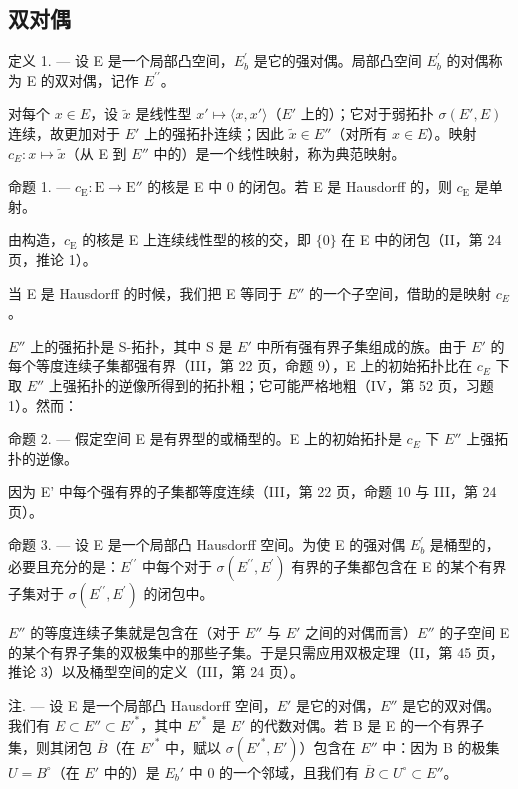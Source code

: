 \subsection{双对偶}

定义 1. --- 设 E 是一个局部凸空间，\(E_{b}^{\prime}\) 是它的强对偶。局部凸空间 \(E_{b}^{\prime}\) 的对偶称为 E 的双对偶，记作 \(E^{\prime\prime}\)。

对每个 \(x \in E\)，设 \(\tilde{x}\) 是线性型 \(x' \mapsto \langle x, x' \rangle\)（\(E'\) 上的）；它对于弱拓扑 \(\sigma(E', E)\) 连续，故更加对于 \(E'\) 上的强拓扑连续；因此 \(\tilde{x} \in E''\)（对所有 \(x \in E\)）。映射 \(c_{E}: x \mapsto \tilde{x}\)（从 E 到 \(E''\) 中的）是一个线性映射，称为典范映射。

命题 1. --- \(c_{\mathrm{E}}: \mathrm{E} \to \mathrm{E}''\) 的核是 E 中 0 的闭包。若 E 是 Hausdorff 的，则 \(c_{\mathrm{E}}\) 是单射。

由构造，\(c_{\mathrm{E}}\) 的核是 E 上连续线性型的核的交，即 \(\{0\}\) 在 E 中的闭包（II，第 24 页，推论 1）。

当 E 是 Hausdorff 的时候，我们把 E 等同于 \(E''\) 的一个子空间，借助的是映射 \(c_{E}\)。

\(E''\) 上的强拓扑是 S-拓扑，其中 S 是 \(E'\) 中所有强有界子集组成的族。由于 \(E'\) 的每个等度连续子集都强有界（III，第 22 页，命题 9），E 上的初始拓扑比在 \(c_{E}\) 下取 \(E''\) 上强拓扑的逆像所得到的拓扑粗；它可能严格地粗（IV，第 52 页，习题 1）。然而：

命题 2. --- 假定空间 E 是有界型的或桶型的。E 上的初始拓扑是 \(c_{E}\) 下 \(E''\) 上强拓扑的逆像。

因为 E' 中每个强有界的子集都等度连续（III，第 22 页，命题 10 与 III，第 24 页）。

命题 3. --- 设 E 是一个局部凸 Hausdorff 空间。为使 E 的强对偶 \(E_{b}^{\prime}\) 是桶型的，必要且充分的是：\(E^{\prime\prime}\) 中每个对于 \(\sigma(E^{\prime\prime}, E^{\prime})\) 有界的子集都包含在 E 的某个有界子集对于 \(\sigma(E^{\prime\prime}, E^{\prime})\) 的闭包中。

\(E''\) 的等度连续子集就是包含在（对于 \(E''\) 与 \(E'\) 之间的对偶而言）\(E''\) 的子空间 E 的某个有界子集的双极集中的那些子集。于是只需应用双极定理（II，第 45 页，推论 3）以及桶型空间的定义（III，第 24 页）。

注. --- 设 E 是一个局部凸 Hausdorff 空间，\(E'\) 是它的对偶，\(E''\) 是它的双对偶。我们有 \(E \subset E'' \subset E'^{*}\)，其中 \(E'^{*}\) 是 \(E'\) 的代数对偶。若 B 是 E 的一个有界子集，则其闭包 \(\overline{B}\)（在 \(E'^{*}\) 中，赋以 \(\sigma(E'^{*}, E')\)）包含在 \(E''\) 中：因为 B 的极集 \(U = B^{\circ}\)（在 \(E'\) 中的）是 \(E_b'\) 中 0 的一个邻域，且我们有 \(\overline{B} \subset U^{\circ} \subset E''\)。

